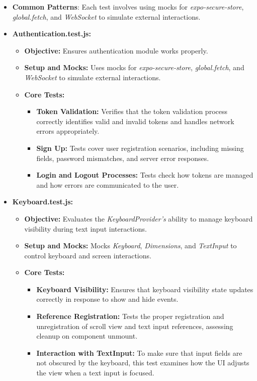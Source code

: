 \begin{itemize}
    \item \textbf{Common Patterns}: Each test involves using mocks for \textit{expo-secure-store}, \textit{global.fetch}, and \textit{WebSocket} to simulate external interactions.

    \item \textbf{Authentication.test.js:}
    \begin{itemize}
        \item \textbf{Objective:} Ensures authentication module works properly.
        \item \textbf{Setup and Mocks:} Uses mocks for \textit{expo-secure-store}, \textit{global.fetch}, and \textit{WebSocket} to simulate external interactions.
        \item \textbf{Core Tests:}
        \begin{itemize}
            \item \textbf{Token Validation:} Verifies that the token validation process correctly identifies valid and invalid tokens and handles network errors appropriately.
            \item \textbf{Sign Up:} Tests cover user registration scenarios, including missing fields, password mismatches, and server error responses.
            \item \textbf{Login and Logout Processes:} Tests check how tokens are managed and how errors are communicated to the user.
        \end{itemize}
    \end{itemize}

    \item \textbf{Keyboard.test.js:}
    \begin{itemize}
        \item \textbf{Objective:} Evaluates the \textit{KeyboardProvider's} ability to manage keyboard visibility during text input interactions.
        \item \textbf{Setup and Mocks:} Mocks \textit{Keyboard}, \textit{Dimensions}, and \textit{TextInput} to control keyboard and screen interactions.
        \item \textbf{Core Tests:}
        \begin{itemize}
            \item \textbf{Keyboard Visibility:} Ensures that keyboard visibility state updates correctly in response to show and hide events.
            \item \textbf{Reference Registration:} Tests the proper registration and unregistration of scroll view and text input references, assessing cleanup on component unmount.
            \item \textbf{Interaction with TextInput:} To make sure that input fields are not obscured by the keyboard, this test examines how the UI adjusts the view when a text input is focused.
        \end{itemize}
    \end{itemize}


\end{itemize}
